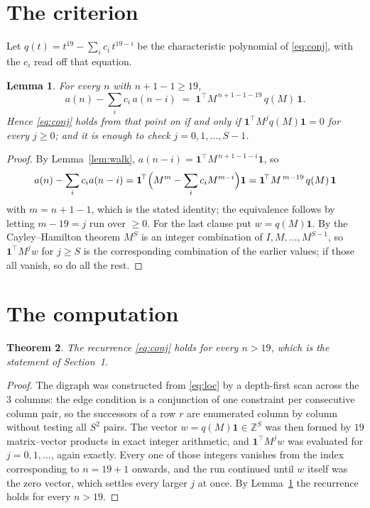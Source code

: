 \documentclass[11pt,a4paper]{article}
\theoremstyle{plain}
\newtheorem{theorem}{Theorem}
\newtheorem{lemma}[theorem]{Lemma}
\theoremstyle{definition}
\begin{document}
\section{The criterion}

Let $q(t)=t^{19}-\sum_i c_i\,t^{19-i}$ be the characteristic polynomial of
\eqref{eq:conj}, with the $c_i$ read off that equation.

\begin{lemma}\label{lem:crit}
For every $n$ with $n+1-1\ge19$,
\[
a(n)-\sum_i c_i\,a(n-i)\;=\;\mathbf{1}^{\!\top}M^{\,n+1-1-19}\,q(M)\,\mathbf{1} .
\]
Hence \eqref{eq:conj} holds from that point on if and only if
$\mathbf{1}^{\!\top}M^{j}q(M)\mathbf{1}=0$ for every $j\ge0$; and it is enough to check
$j=0,1,\dots,S-1$.
\end{lemma}

\begin{proof}
By Lemma~\ref{lem:walk}, $a(n-i)=\mathbf{1}^{\!\top}M^{\,n+1-1-i}\mathbf{1}$, so
\[
a(n)-\sum_i c_i a(n-i)
=\mathbf{1}^{\!\top}\Bigl(M^{m}-\sum_i c_i M^{m-i}\Bigr)\mathbf{1}
=\mathbf{1}^{\!\top}M^{\,m-19}\,q(M)\,\mathbf{1}
\]
with $m=n+1-1$, which is the stated identity; the equivalence follows by letting
$m-19=j$ run over $\ge0$. For the last clause put $w=q(M)\mathbf{1}$. By the
Cayley--Hamilton theorem $M^{S}$ is an integer combination of $I,M,\dots,M^{S-1}$, so
$\mathbf{1}^{\!\top}M^{j}w$ for $j\ge S$ is the corresponding combination of the earlier
values; if those all vanish, so do all the rest.
\end{proof}

\section{The computation}

\begin{theorem}
The recurrence \eqref{eq:conj} holds for every $n>19$, which is the statement of
Section~1.
\end{theorem}

\begin{proof}
The digraph was constructed from \eqref{eq:loc} by a depth-first scan across the $3$
columns: the edge condition is a conjunction of one constraint per consecutive column
pair, so the successors of a row $r$ are enumerated column by column without testing all
$S^2$ pairs. The vector $w=q(M)\mathbf{1}\in\mathbb{Z}^{S}$ was then formed by $19$
matrix--vector products in exact integer arithmetic, and $\mathbf{1}^{\!\top}M^{j}w$ was
evaluated for $j=0,1,\dots$, again exactly. Every one of those integers vanishes from the
index corresponding to $n=19+1$ onwards, and the run continued until $w$ itself was the
zero vector, which settles every larger $j$ at once. By Lemma~\ref{lem:crit} the recurrence
holds for every $n>19$.
\end{proof}
\end{document}
